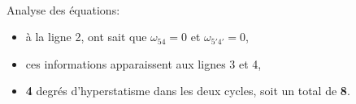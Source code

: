 ~\

Analyse des équations:
\begin{itemize}
 \item à la ligne 2, ont sait que $\omega_{54}=0$ et $\omega_{5'4'}=0$,
 \item ces informations apparaissent aux lignes 3 et 4,
 \item \textbf{4} degrés d'hyperstatisme dans les deux cycles, soit un total de \textbf{8}.
\end{itemize}


